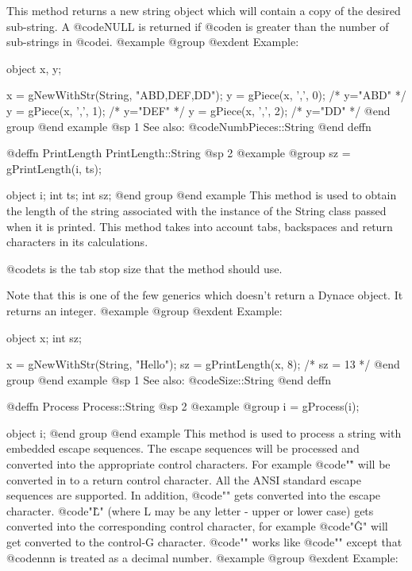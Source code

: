 This method returns a new string object which will contain a copy of the
desired sub-string.  A @code{NULL} is returned if @code{n} is greater
than the number of sub-strings in @code{i}.
@example
@group
@exdent Example:

object  x, y;

x = gNewWithStr(String, "ABD,DEF,DD");
y = gPiece(x, ',', 0);  /*  y="ABD"  */
y = gPiece(x, ',', 1);  /*  y="DEF"  */
y = gPiece(x, ',', 2);  /*  y="DD"   */
@end group
@end example
@sp 1
See also:  @code{NumbPieces::String}
@end deffn























@deffn {PrintLength} PrintLength::String
@sp 2
@example
@group
sz = gPrintLength(i, ts);

object  i;
int     ts;
int     sz;
@end group
@end example
This method is used to obtain the length of the string associated with
the instance of the String class passed when it is printed.  This
method takes into account tabs, backspaces and return characters in
its calculations.

@code{ts} is the tab stop size that the method should use.

Note that this is one of the few generics which doesn't return a Dynace
object.  It returns an integer.
@example
@group
@exdent Example:

object  x;
int     sz;

x = gNewWithStr(String, "Hello\tWorld\bx");
sz = gPrintLength(x, 8);
/*  sz = 13   */
@end group
@end example
@sp 1
See also:  @code{Size::String}
@end deffn











@deffn {Process} Process::String
@sp 2
@example
@group
i = gProcess(i);

object  i;
@end group
@end example
This method is used to process a string with embedded escape sequences.
The escape sequences will be processed and converted into the appropriate
control characters.  For example @code{"\r"} will be converted in to a return
control character.  All the ANSI standard escape sequences are supported.
In addition, @code{"\e"} gets converted into the escape character.
@code{"\^L"} (where L may be any letter - upper or lower case) gets
converted into the corresponding control character, for example
@code{"\^G"} will get converted to the control-G character.
@code{"\dnnn"} works like @code{"\xnnn"} except that @code{nnn} is
treated as a decimal number.
@example
@group
@exdent Example:

